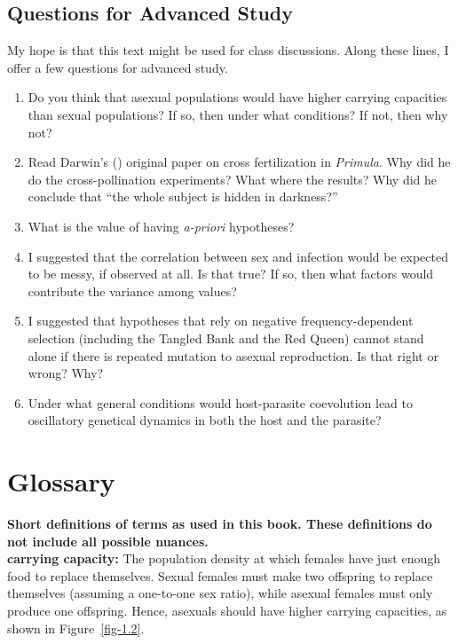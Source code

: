 \documentclass[
  letterpaper,
]{book}
\providecommand{\tightlist}{%
  \setlength{\itemsep}{0pt}\setlength{\parskip}{0pt}}\usepackage{longtable,booktabs,array}
\begin{document}
\section{Questions for Advanced
Study}\label{questions-for-advanced-study}

My hope is that this text might be used for class discussions. Along
these lines, I offer a few questions for advanced study.

\begin{enumerate}
\def\labelenumi{\arabic{enumi}.}
\tightlist
\item
  Do you think that asexual populations would have higher carrying
  capacities than sexual populations? If so, then under what conditions?
  If not, then why not?
\item
  Read Darwin's () original paper on
  cross fertilization in \emph{Primula}. Why did he do the
  cross-pollination experiments? What where the results? Why did he
  conclude that ``the whole subject is hidden in darkness?''
\item
  What is the value of having \emph{a-priori} hypotheses?
\item
  I suggested that the correlation between sex and infection would be
  expected to be messy, if observed at all. Is that true? If so, then
  what factors would contribute the variance among values?
\item
  I suggested that hypotheses that rely on negative frequency-dependent
  selection (including the Tangled Bank and the Red Queen) cannot stand
  alone if there is repeated mutation to asexual reproduction. Is that
  right or wrong? Why?
\item
  Under what general conditions would host-parasite coevolution lead to
  oscillatory genetical dynamics in both the host and the parasite?
\end{enumerate}


\chapter*{Glossary}\label{sec-glossary}


\textbf{Short definitions of terms as used in this book. These
definitions do not include all possible nuances.}\\

\textbf{carrying capacity:} The population density at which females have
just enough food to replace themselves. Sexual females must make two
offspring to replace themselves (assuming a one-to-one sex ratio), while
asexual females must only produce one offspring. Hence, asexuals should
have higher carrying capacities, as shown in Figure~\ref{fig-1.2}.
\end{document}
